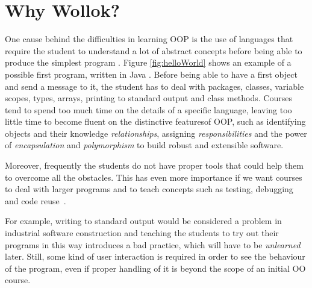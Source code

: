 \section{Why Wollok?}
\label{sec:problem}


One cause behind the difficulties in learning OOP 
is the use of languages that require the student to understand a lot of abstract concepts 
before being able to produce the simplest program \cite{kolling_problem_1999}.
Figure \ref{fig:helloWorld} shows an example of a possible first program, written in Java \cite{arnold_java_1996}.
Before being able to have a first object and send a message to it,
the student has to deal with packages, classes, variable scopes, types, arrays, 
printing to standard output and class methods. 
Courses tend to spend too much time on the details of a specific language, 
leaving too little time to become fluent on the distinctive featuresof OOP,
such as identifying objects and their knowledge \emph{relationships}, 
assigning \emph{responsibilities} 
and the power of \emph{encapsulation} and \emph{polymorphism} 
to build robust and extensible software.

Moreover, frequently the students do not have proper tools that could help them to overcome all the obstacles.
This has even more importance 
if we want courses to deal with larger programs 
and to teach concepts such as testing, debugging and code reuse~\cite{kolling_problem_1999}.
 
For example, writing to standard output would be considered a problem in industrial software construction and teaching the students to try out their programs in this way 
introduces a bad practice,
which will have to be \emph{unlearned} later.
Still, some kind of user interaction is required 
in order to see the behaviour of the program,
even if proper handling of it is beyond the scope of an initial OO course.


